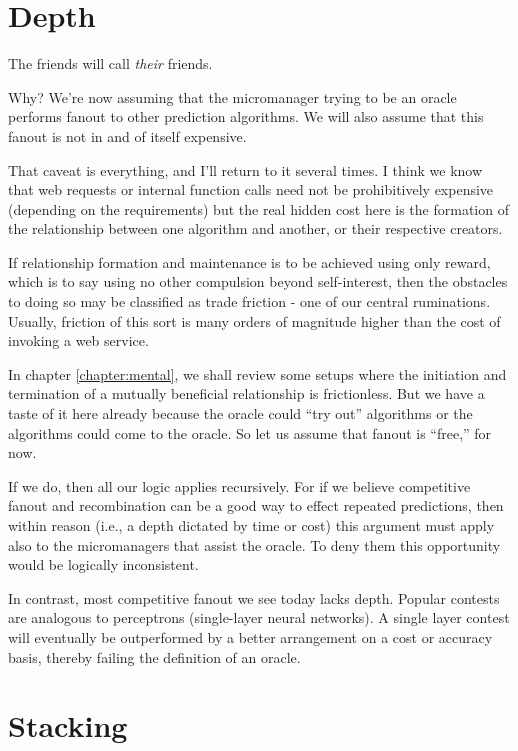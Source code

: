 \section{Depth}

The friends will call {\em their} friends. 

Why? We're now assuming that the micromanager trying to be an oracle performs fanout to other prediction algorithms. We will also assume that this fanout {is not in and of itself expensive}. 

That caveat is everything, and I'll return to it several times. I think we know that web requests or internal function calls need not be prohibitively expensive (depending on the requirements) but the real hidden cost here is the formation of the relationship between one algorithm and another, or their respective creators. 

If relationship formation and maintenance is to be achieved using only reward, which is to say using no other compulsion beyond self-interest, then the obstacles to doing so may be classified as trade friction - one of our central ruminations. Usually, friction of this sort is many orders of magnitude higher than the cost of invoking a web service. 

In chapter \ref{chapter:mental}, we shall review some setups where the initiation and termination of a mutually beneficial relationship is frictionless. But we have a taste of it here already because the oracle could ``try out'' algorithms or the algorithms could come to the oracle. So let us assume that fanout is ``free,'' for now. 

If we do, then all our logic applies recursively. For if we believe competitive fanout and recombination can be a good way to effect repeated predictions, then within reason (i.e., a depth dictated by time or cost) this argument must apply also to the micromanagers that assist the oracle. To deny them this opportunity would be logically inconsistent. 

In contrast, most competitive fanout we see today lacks depth. Popular contests are analogous to perceptrons (single-layer neural networks). A single layer contest will eventually be outperformed by a better arrangement on a cost or accuracy basis, thereby failing the definition of an oracle. 


\section{Stacking}

